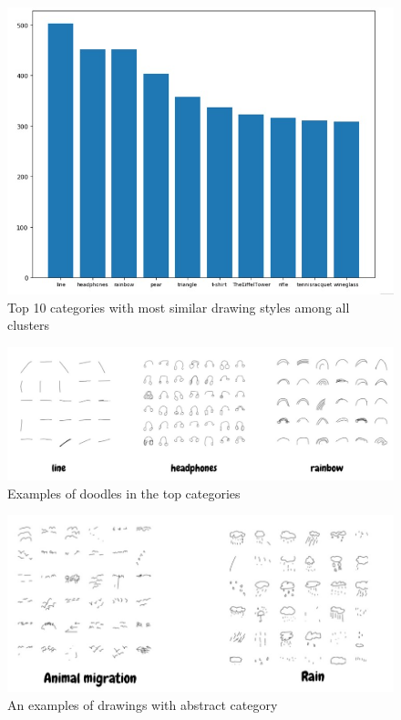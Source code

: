 \begin{figure}[ht]
\begin{center}
   \includegraphics[width=1\linewidth]{figures/top_category.jpg}
\end{center}
   \caption{Top 10 categories with most similar drawing styles among all clusters}
\label{fig:top_category}
\end{figure}


\begin{figure}[ht]
\begin{center}
   \includegraphics[width=1\linewidth]{figures/1.jpg}
\end{center}
   \caption{Examples of doodles in the top categories }
\label{fig:1}
\end{figure}


\begin{figure}[ht]
\begin{center}
   \includegraphics[width=1\linewidth]{figures/2.jpg}
\end{center}
   \caption{An examples of drawings with abstract category }
\label{fig:2}
\end{figure}

